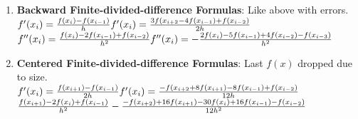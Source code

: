 \documentclass[fontsize=5pt]{scrartcl}
\begin{document}
\begin{multicols}{3}
\begin{enumerate}
        \item \textbf{Backward Finite-divided-difference Formulas}: Like above with errors. \\
        \begin{math}
          f'(x_i)=\frac{f(x_{i})-f(x_{i-1})}{h}\\
          f'(x_i)=\frac{3f(x_{i+2}-4f(x_{i-1})+f(x_{i-2})}{2h}\\
        \end{math} \\
        \begin{math}
          f''(x_i)=\frac{f(x_i)-2f(x_{i-1})+f(x_{i-2})}{h^2} \\
          f''(x_i)=-\frac{2f(x_i)-5f(x_{i-1})+4f(x_{i-2})-f(x_{i-3})}{h^2}
        \end{math}

        \item \textbf{Centered Finite-divided-difference Formulas}: Last $f(x)$ dropped due to size. \\
        \begin{math}
          f'(x_i)=\frac{f(x_{i+1})-f(x_{i-1})}{2h}\\
          f'(x_i)=\frac{-f(x_{i+2}+8f(x_{i+1})-8f(x_{i-1})+f(x_{i-2})}{12h}\\
        \end{math} \\
        \begin{math}
          \frac{f(x_{i+1})-2f(x_i)+f(x_{i-1})}{h^2} \\
          -\frac{-f(x_{i+2})+16f(x_{i+1})-30f(x_i)+16f(x_{i-1})-f(x_{i-2})}{12h^2}
        \end{math}


\end{enumerate}
\end{multicols}
\end{document}
